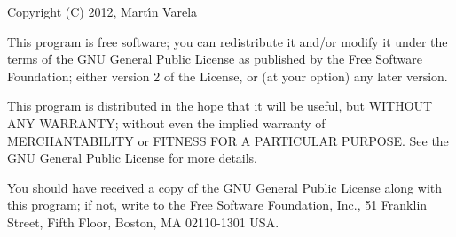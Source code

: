 \documentclass{article}
\begin{document}
 Copyright (C) 2012, Mart\'\i n Varela

    This program is free software; you can redistribute it and/or modify
    it under the terms of the GNU General Public License as published by
    the Free Software Foundation; either version 2 of the License, or
    (at your option) any later version.

    This program is distributed in the hope that it will be useful,
    but WITHOUT ANY WARRANTY; without even the implied warranty of
    MERCHANTABILITY or FITNESS FOR A PARTICULAR PURPOSE.  See the
    GNU General Public License for more details.

    You should have received a copy of the GNU General Public License along
    with this program; if not, write to the Free Software Foundation, Inc.,
    51 Franklin Street, Fifth Floor, Boston, MA 02110-1301 USA.
\end{document}

